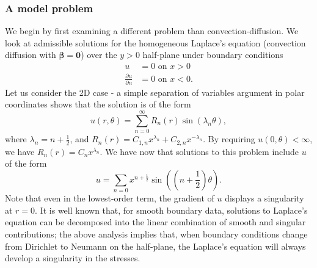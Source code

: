 \documentclass[letterpaper]{article}
\def\bbeta{\boldsymbol\beta}
\newcommand{\bs}[1]{\boldsymbol{#1}}
\newcommand{\seclab}[1]{\label{sec:#1}}
\newcommand{\LRp}[1]{\left( #1 \right)}
\newcommand{\pd}[2]{\frac{\partial#1}{\partial#2}}
\begin{document}
\subsubsection{A model problem}
\seclab{sec:confusionPlate}
We begin by first examining a different problem than convection-diffusion.
We look at admissible solutions for the homogeneous Laplace's equation
(convection diffusion with $\bbeta=\bs 0$) over
the $y > 0$ half-plane under boundary conditions
\begin{align*}
u &= 0 \text{ on } x > 0\\
\pd{u}{n} &= 0 \text{ on } x < 0.
\end{align*}
Let us consider the 2D case - a simple separation of variables argument in
polar coordinates shows that the solution is of the form
\[
u(r,\theta) = \sum_{n=0}^\infty R_n(r) \sin(\lambda_n \theta),
\]
where $\lambda_n = n + \frac{1}{2}$, and $R_n(r) = C_{1,n}x^{\lambda_n} +
C_{2,n}x^{-\lambda_n}$.  By requiring $u(0,\theta) < \infty$, we have $R_n(r)
= C_n x^{\lambda_n}$.  We have now that solutions to this problem include $u$
of the form
\[
u = \sum_{n=0} x^{n+\frac{1}{2}} \sin\LRp{\LRp{n+\frac{1}{2}}\theta}.
\]
Note that even in the lowest-order term, the gradient of $u$ displays a
singularity at $r = 0$. It is well known that, for smooth boundary data,
solutions to Laplace’s equation can be decomposed into the linear combination
of smooth and singular contributions; the above analysis implies that, when
boundary conditions change from Dirichlet to Neumann on the half-plane, the
Laplace’s equation will always develop a singularity in the stresses.
\end{document}
